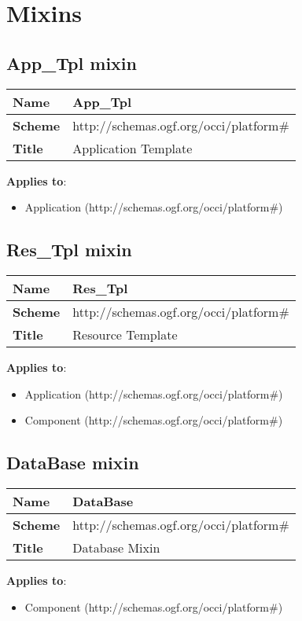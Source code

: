 \documentclass{article}
\begin{document}
\section{Mixins}
\subsection{App\_Tpl mixin}
\begin{center}
\begin{tabular}{|l|l|}
  \hline
  \textbf{Name} & App\_Tpl \\
  \hline  
  \textbf{Scheme} & http://schemas.ogf.org/occi/platform\# \\
  \hline
  \textbf{Title} & Application Template \\
  \hline
\end{tabular}
\end{center}
\textbf{Applies to}:
\begin{itemize}
	\item Application (http://schemas.ogf.org/occi/platform\#)
\end{itemize}



\subsection{Res\_Tpl mixin}
\begin{center}
\begin{tabular}{|l|l|}
  \hline
  \textbf{Name} & Res\_Tpl \\
  \hline  
  \textbf{Scheme} & http://schemas.ogf.org/occi/platform\# \\
  \hline
  \textbf{Title} & Resource Template \\
  \hline
\end{tabular}
\end{center}
\textbf{Applies to}:
\begin{itemize}
	\item Application (http://schemas.ogf.org/occi/platform\#)
	\item Component (http://schemas.ogf.org/occi/platform\#)
\end{itemize}



\subsection{DataBase mixin}
\begin{center}
\begin{tabular}{|l|l|}
  \hline
  \textbf{Name} & DataBase \\
  \hline  
  \textbf{Scheme} & http://schemas.ogf.org/occi/platform\# \\
  \hline
  \textbf{Title} & Database Mixin \\
  \hline
\end{tabular}
\end{center}
\textbf{Applies to}:
\begin{itemize}
	\item Component (http://schemas.ogf.org/occi/platform\#)
\end{itemize}
\end{document}
